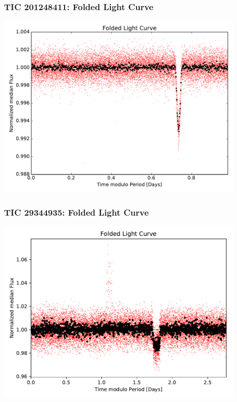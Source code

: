 \documentclass[notes]{beamer}
\begin{document}
\begin{frame}
\frametitle{TIC 201248411: Folded Light Curve}
\centering
\includegraphics[width=0.9\textwidth]{../figures/2019-1-15_16:2:14_Folded_TIC201248411.pdf}
\end{frame}

\begin{frame}
\frametitle{TIC 29344935: Folded Light Curve}
\centering
\includegraphics[width=0.9\textwidth]{../figures/2019-1-16_12:58:51_Folded_TIC29344935.pdf}
\end{frame}
\end{document}
